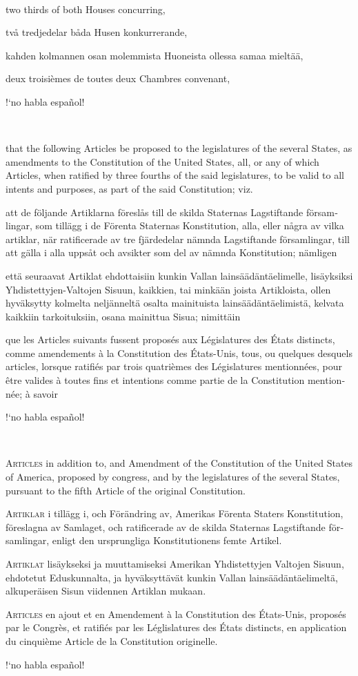\documentclass[a4paper,landscape,10pt]{article}
\newcommand{\tblock}[5]{\noindent\begin{minipage}[t]{0.18\textwidth}\foreignlanguage{english}{#1}\end{minipage}\hskip 0.025\textwidth\begin{minipage}[t]{0.18\textwidth}\foreignlanguage{swedish}{#2}\end{minipage}\hskip 0.025\textwidth\begin{minipage}[t]{0.18\textwidth}\foreignlanguage{finnish}{#3}\end{minipage}\hskip 0.025\textwidth\begin{minipage}[t]{0.18\textwidth}\foreignlanguage{french}{#4}\end{minipage}\hskip 0.025\textwidth\begin{minipage}[t]{0.18\textwidth}\foreignlanguage{spanish}{#5}\end{minipage}}
\begin{document}
~

\tblock
{two thirds of both Houses concurring,}
{två tredjedelar båda Husen konkurrerande,}
{kahden kolmannen osan molemmista Huoneista ollessa samaa mieltää,}
{deux troisièmes de toutes deux Chambres convenant,}
{!`no habla español!}

~

\tblock
{that the following Articles be proposed to the \Glspl{legislature} of the several States, as amendments to the Constitution of the United States, all, or any of which Articles, when ratified by three fourths of the said \Glspl{legislature}, to be valid to all intents and purposes, as part of the said Constitution; viz.}
{att de följande Artiklarna föreslås till de skilda Staternas Lagstiftande församlingar, som tillägg i de Förenta Staternas Konstitution, alla, eller några av vilka artiklar, när ratificerade av tre fjärdedelar nämnda Lagstiftande församlingar, till att gälla i alla uppsåt och avsikter som del av nämnda Konstitution; nämligen}
{että seuraavat Artiklat ehdottaisiin kunkin Vallan lainsäädäntäelimelle, lisäyksiksi Yhdistettyjen-Valtojen Sisuun, kaikkien, tai minkään joista Artikloista, ollen hyväksytty kolmelta neljänneltä osalta mainituista lainsäädäntäelimistä, kelvata kaikkiin tarkoituksiin, osana mainittua Sisua; nimittäin}
{que les Articles suivants fussent proposés aux Législatures des États distincts, comme amendements à la Constitution des États-Unis, tous, ou quelques desquels articles, lorsque ratifiés par trois quatrièmes des Législatures mentionnées, pour être valides à toutes fins et intentions comme partie de la Constitution mentionnée; à savoir}
{!`no habla español!}

~

\tblock
{\textsc{Articles} in addition to, and Amendment of the Constitution of the United States of America, proposed by \Gls{congress}, and \glsdisp{ratify}{ratified} by the \Glspl{legislature} of the several States, pursuant to the fifth Article of the original Constitution.}
{\textsc{Artiklar} i tillägg i, och Förändring av, Amerikas Förenta Staters Konstitution, föreslagna av Samlaget, och ratificerade av de skilda Staternas Lagstiftande församlingar, enligt den ursprungliga Konstitutionens femte Artikel.}
{\textsc{Artiklat} lisäykseksi ja muuttamiseksi Amerikan Yhdistettyjen Valtojen Sisuun, ehdotetut Eduskunnalta, ja hyväksyttävät kunkin Vallan lainsäädäntäelimeltä, alkuperäisen Sisun viidennen Artiklan mukaan.}
{\textsc{Articles} en ajout et en Amendement à la Constitution des États-Unis, proposés par le Congrès, et ratifiés par les Léglislatures des États distincts, en application du cinquième Article de la Constitution originelle.}
{!`no habla español!}
\end{document}
